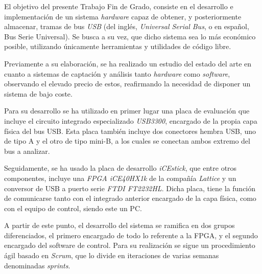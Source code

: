 \begin{resumen}

El objetivo del presente Trabajo Fin de Grado, consiste en el desarrollo e implementación de un sistema \emph{hardware} capaz de obtener, y posteriormente almacenar, tramas de bus \emph{USB} (del inglés, \emph{Universal Serial Bus}, o en español, Bus Serie Universal). Se busca a su vez, que dicho sistema sea lo más económico posible, utilizando únicamente herramientas y utilidades de código libre.

Previamente a su elaboración, se ha realizado un estudio del estado del arte en cuanto a sistemas de captación y análisis tanto \emph{hardware} como \emph{software}, observando el elevado precio de estos, reafirmando la necesidad de disponer un sistema de bajo coste.

Para su desarrollo se ha utilizado en primer lugar una placa de evaluación que incluye el circuito integrado especializado \emph{USB3300}, encargado de la propia capa física del bus USB. Esta placa también incluye dos conectores hembra USB, uno de tipo A y el otro de tipo mini-B, a los cuales se conectan ambos extremo del bus a analizar.

Seguidamente, se ha usado la placa de desarrollo \emph{iCEstick}, que entre otros componentes, incluye una \emph{FPGA iCE40HX1k} de la compañía \emph{Lattice} y un conversor de USB a puerto serie \emph{FTDI FT2232HL}. Dicha placa, tiene la función de comunicarse tanto con el integrado anterior encargado de la capa física, como con el equipo de control, siendo este un PC.

A partir de este punto, el desarrollo del sistema se ramifica en dos grupos diferenciados, el primero encargado de todo lo referente a la FPGA, y el segundo encargado del software de control. Para su realización se sigue un procedimiento ágil basado en \emph{Scrum}, que lo divide en iteraciones de varias semanas denominadas \emph{sprints}.


\end{resumen}
